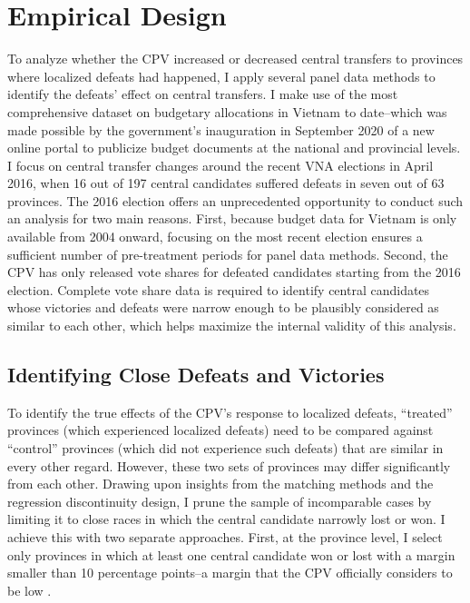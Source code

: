 \documentclass[12pt]{article}
\newcommand{\1}{\mathbbm{1}}
\begin{document}
\section*{Empirical Design}
\label{sec:methods}

To analyze whether the CPV increased or decreased central transfers to provinces where localized defeats had happened, I apply several panel data methods to identify the defeats' effect on central transfers. I make use of the most comprehensive dataset on budgetary allocations in Vietnam to date--which was made possible by the government's inauguration in September 2020 of a new online portal to publicize budget documents at the national and provincial levels. I focus on central transfer changes around the recent VNA elections in April 2016, when 16 out of 197 central candidates suffered defeats in seven out of 63 provinces. The 2016 election offers an unprecedented opportunity to conduct such an analysis for two main reasons. First, because budget data for Vietnam is only available from 2004 onward, focusing on the most recent election ensures a sufficient number of pre-treatment periods for panel data methods. Second, the CPV has only released vote shares for defeated candidates starting from the 2016 election. Complete vote share data is required to identify central candidates whose victories and defeats were narrow enough to be plausibly considered as similar to each other, which helps maximize the internal validity of this analysis.

\subsection*{Identifying Close Defeats and Victories}
\label{sec:methods_sample}

To identify the true effects of the CPV's response to localized defeats, ``treated'' provinces (which experienced localized defeats) need to be compared against ``control'' provinces (which did not experience such defeats) that are similar in every other regard. However, these two sets of provinces may differ significantly from each other. 
Drawing upon insights from the matching methods and the regression discontinuity design, I prune the sample of incomparable cases by limiting it to close races in which the central candidate narrowly lost or won. I achieve this with two separate approaches. First, at the province level, I select only provinces in which at least one central candidate won or lost with a margin smaller than 10 percentage points--a margin that the CPV officially considers to be low \citep{MaleskySchuler2011}.
\end{document}
